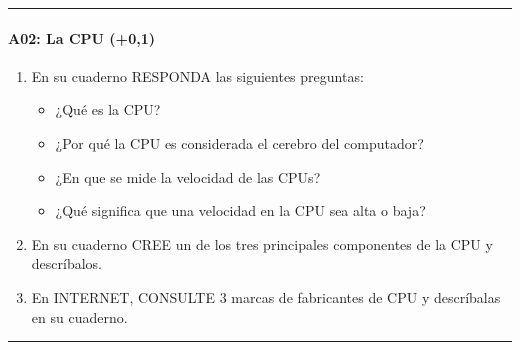 \documentclass[letterpaper,10pt,spanish]{sphinxmanual}
\begin{document}
\bigskip\hrule\bigskip



\paragraph{A02: La CPU (+0,1)}
\label{\detokenize{cursos/logica8/periodo01/G01:a02-la-cpu-0-1}}
\sphinxAtStartPar
{}
\begin{enumerate}
%
\item {} 
\sphinxAtStartPar
En su cuaderno RESPONDA las siguientes preguntas:
\begin{itemize}
\item {} 
\sphinxAtStartPar
¿Qué es la CPU?

\item {} 
\sphinxAtStartPar
¿Por qué la CPU es considerada el cerebro del computador?

\item {} 
\sphinxAtStartPar
¿En que se mide la velocidad de las CPUs?

\item {} 
\sphinxAtStartPar
¿Qué significa que una velocidad en la CPU sea alta o baja?

\end{itemize}

\item {} 
\sphinxAtStartPar
En su cuaderno CREE un  de los tres principales componentes de la CPU y descríbalos.

\item {} 
\sphinxAtStartPar
En INTERNET, CONSULTE 3 marcas de fabricantes de CPU y descríbalas en su cuaderno.

\end{enumerate}


\bigskip\hrule\bigskip
\end{document}
